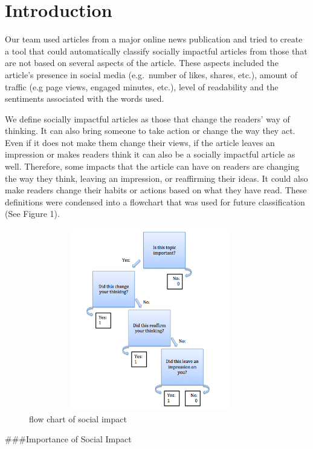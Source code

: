 \documentclass[10pt,letterpaper]{article}
\begin{document}
\linenumbers

\hypertarget{introduction}{%
\section{Introduction}\label{introduction}}

Our team used articles from a major online news publication and tried to
create a tool that could automatically classify socially impactful
articles from those that are not based on several aspects of the
article. These aspects included the article's presence in social media
(e.g.~number of likes, shares, etc.), amount of traffic (e.g page views,
engaged minutes, etc.), level of readability and the sentiments
associated with the words used.

We define socially impactful articles as those that change the readers'
way of thinking. It can also bring someone to take action or change the
way they act. Even if it does not make them change their views, if the
article leaves an impression or makes readers think it can also be a
socially impactful article as well. Therefore, some impacts that the
article can have on readers are changing the way they think, leaving an
impression, or reaffirming their ideas. It could also make readers
change their habits or actions based on what they have read. These
definitions were condensed into a flowchart that was used for future
classification (See Figure 1).

\begin{figure}
\includegraphics[width=400px,height=300px]{flow-chart} \caption{flow chart of social impact}\label{fig:unnamed-chunk-1}
\end{figure}

\#\#\#Importance of Social Impact
\end{document}
